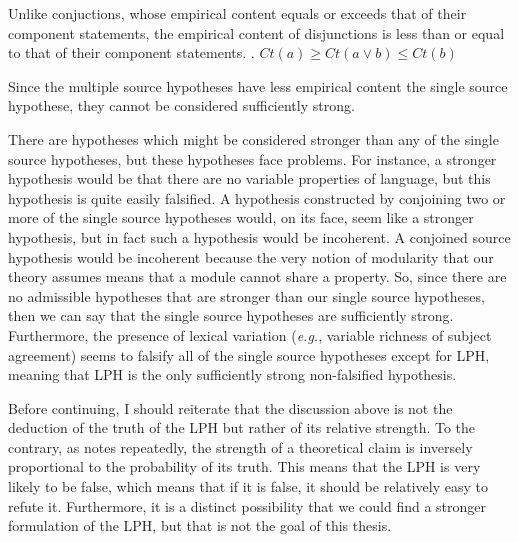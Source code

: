 \documentclass[MilwayThesis]{subfiles}
\begin{document}
Unlike conjuctions, whose empirical content equals or exceeds that of their component statements, the empirical content of disjunctions is less than or equal to that of their component statements.
\ex. $Ct(a) \geq Ct(a\vee b) \leq Ct(b)$

Since the multiple source hypotheses have less empirical content the single source hypothese, they cannot be considered sufficiently strong.

There are hypotheses which might be considered stronger than any of the single source hypotheses, but these hypotheses face problems.
For instance, a stronger hypothesis would be that there are no variable properties of language, but this hypothesis is quite easily falsified.
A hypothesis constructed by conjoining two or more of the single source hypotheses would, on its face, seem like a stronger hypothesis, but in fact such a hypothesis would be incoherent.
A conjoined source hypothesis would be incoherent because the very notion of modularity that our theory assumes means that a module cannot share a property.
So, since there are no admissible hypotheses that are stronger than our single source hypotheses, then we can say that the single source hypotheses are sufficiently strong.
Furthermore, the presence of lexical variation (\textit{e.g.}, variable richness of subject agreement) seems to falsify all of the single source hypotheses except for LPH, meaning that LPH is the only sufficiently strong non-falsified hypothesis.

Before continuing, I should reiterate that the discussion above is not the deduction of the truth of the LPH but rather of its relative strength.
To the contrary, as \textcite{popper2014conjectures} notes repeatedly, the strength of a theoretical claim is inversely proportional to the probability of its truth.
This means that the LPH is very likely to be false, which means that if it is false, it should be relatively easy to refute it.
Furthermore, it is a distinct possibility that we could find a stronger formulation of the LPH, but that is not the goal of this thesis.
\end{document}
